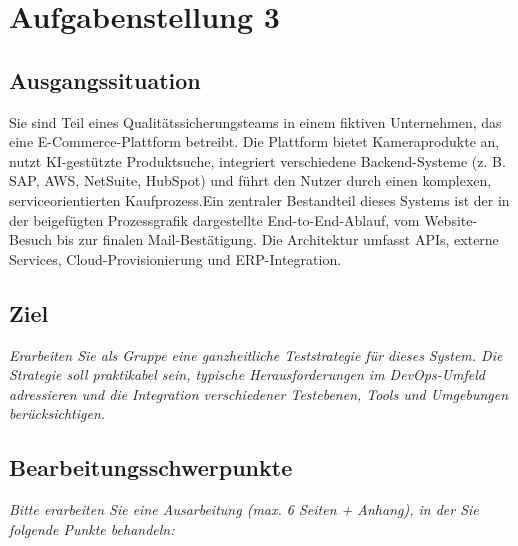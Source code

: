 \newpage
\section{Aufgabenstellung 3}

\subsection{Ausgangssituation}
Sie sind Teil eines Qualitätssicherungsteams in einem fiktiven Unternehmen, das eine E-Commerce-Plattform betreibt. Die Plattform bietet Kameraprodukte an, nutzt KI-gestützte Produktsuche, integriert verschiedene Backend-Systeme (z. B. SAP, AWS, NetSuite, HubSpot) und führt den Nutzer durch einen komplexen, serviceorientierten Kaufprozess.Ein zentraler Bestandteil dieses Systems ist der in der beigefügten Prozessgrafik dargestellte End-to-End-Ablauf, vom Website-Besuch bis zur finalen Mail-Bestätigung. Die Architektur umfasst APIs, externe Services, Cloud-Provisionierung und ERP-Integration.

\subsection{Ziel}
\textit{Erarbeiten Sie als Gruppe eine ganzheitliche Teststrategie für dieses System. Die Strategie soll praktikabel sein, typische Herausforderungen im DevOps-Umfeld adressieren und die Integration verschiedener Testebenen, Tools und Umgebungen berücksichtigen.}

\subsection{Bearbeitungsschwerpunkte}
\textit{Bitte erarbeiten Sie eine Ausarbeitung (max. 6 Seiten + Anhang), in der Sie folgende Punkte behandeln:}

